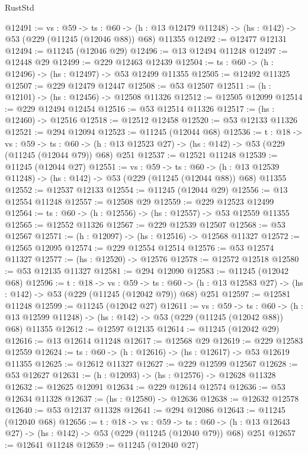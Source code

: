 \begin{lexlean}{RustStd}
\begin{coremodule}
@12491 := {vs : @59} ->
  {ts : @60} ->
  (h : @13 @12479 @11248) -> (hs : @142) -> @53 (@229 (@11245 (@12046 @88)) @68) @11355
@12492 := @12477 @12131
@12494 := @11245 (@12046 @29)
@12496 := @13 @12494 @11248
@12497 := @12448 @29
@12499 := @229 @12463 @12439
@12504 := {ts : @60} -> (h : @12496) -> (hs : @12497) -> @53 @12499 @11355
@12505 := @12492 @11325
@12507 := @229 @12479 @12447
@12508 := @53 @12507
@12511 := (h : @12101) -> (hs : @12456) -> @12508 @11326
@12512 := @12505 @12099
@12514 := @229 @12494 @12454
@12516 := @53 @12514 @11326
@12517 := (hs : @12460) -> @12516
@12518 := @12512 @12458
@12520 := @53 @12133 @11326
@12521 := @294 @12094
@12523 := @11245 (@12044 @68)
@12536 := {t : @18} ->
  {vs : @59} ->
  {ts : @60} -> (h : @13 @12523 @27) -> (hs : @142) -> @53 (@229 (@11245 (@12044 @79)) @68) @251
@12537 := @12521 @11248
@12539 := @11245 (@12044 @27)
@12551 := {vs : @59} ->
  {ts : @60} ->
  (h : @13 @12539 @11248) -> (hs : @142) -> @53 (@229 (@11245 (@12044 @88)) @68) @11355
@12552 := @12537 @12133
@12554 := @11245 (@12044 @29)
@12556 := @13 @12554 @11248
@12557 := @12508 @29
@12559 := @229 @12523 @12499
@12564 := {ts : @60} -> (h : @12556) -> (hs : @12557) -> @53 @12559 @11355
@12565 := @12552 @11326
@12567 := @229 @12539 @12507
@12568 := @53 @12567
@12571 := (h : @12097) -> (hs : @12516) -> @12568 @11327
@12572 := @12565 @12095
@12574 := @229 @12554 @12514
@12576 := @53 @12574 @11327
@12577 := (hs : @12520) -> @12576
@12578 := @12572 @12518
@12580 := @53 @12135 @11327
@12581 := @294 @12090
@12583 := @11245 (@12042 @68)
@12596 := {t : @18} ->
  {vs : @59} ->
  {ts : @60} -> (h : @13 @12583 @27) -> (hs : @142) -> @53 (@229 (@11245 (@12042 @79)) @68) @251
@12597 := @12581 @11248
@12599 := @11245 (@12042 @27)
@12611 := {vs : @59} ->
  {ts : @60} ->
  (h : @13 @12599 @11248) -> (hs : @142) -> @53 (@229 (@11245 (@12042 @88)) @68) @11355
@12612 := @12597 @12135
@12614 := @11245 (@12042 @29)
@12616 := @13 @12614 @11248
@12617 := @12568 @29
@12619 := @229 @12583 @12559
@12624 := {ts : @60} -> (h : @12616) -> (hs : @12617) -> @53 @12619 @11355
@12625 := @12612 @11327
@12627 := @229 @12599 @12567
@12628 := @53 @12627
@12631 := (h : @12093) -> (hs : @12576) -> @12628 @11328
@12632 := @12625 @12091
@12634 := @229 @12614 @12574
@12636 := @53 @12634 @11328
@12637 := (hs : @12580) -> @12636
@12638 := @12632 @12578
@12640 := @53 @12137 @11328
@12641 := @294 @12086
@12643 := @11245 (@12040 @68)
@12656 := {t : @18} ->
  {vs : @59} ->
  {ts : @60} -> (h : @13 @12643 @27) -> (hs : @142) -> @53 (@229 (@11245 (@12040 @79)) @68) @251
@12657 := @12641 @11248
@12659 := @11245 (@12040 @27)

\end{coremodule}
\end{lexlean}
